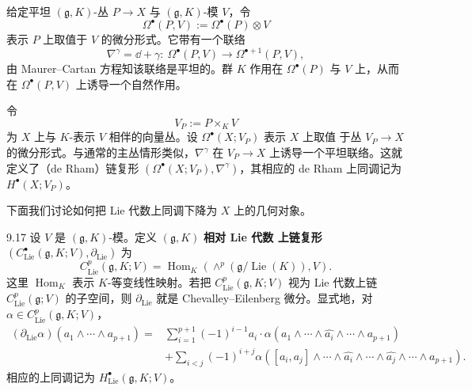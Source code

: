 
给定平坦 $(\mathfrak{g},K)$-丛 $P\to X$ 与 $(\mathfrak{g},K)$-模 $V$，令
\[
  \Omega^\bullet(P,V):=\Omega^\bullet(P)\otimes V
\]
表示 $P$ 上取值于 $V$ 的微分形式。它带有一个联络
\[
  \nabla^\gamma=\dd+\gamma:\ \Omega^\bullet(P,V)\longrightarrow\Omega^{\bullet+1}(P,V),
\]
由 Maurer--Cartan 方程知该联络是平坦的。群 $K$ 作用在 $\Omega^\bullet(P)$ 与 $V$
上，从而在 $\Omega^\bullet(P,V)$ 上诱导一个自然作用。

令
\[
  V_P:=P\times_K V
\]
为 $X$ 上与 $K$-表示 $V$ 相伴的向量丛。设 $\Omega^\bullet(X;V_P)$ 表示 $X$ 上取值
于丛 $V_P\to X$ 的微分形式。与通常的主丛情形类似，$\nabla^\gamma$ 在 $V_P\to X$
上诱导一个平坦联络。这就定义了（de Rham）链复形
$(\Omega^\bullet(X;V_P),\nabla^\gamma)$，其相应的 de Rham 上同调记为
$H^\bullet(X;V_P)$。

下面我们讨论如何把 Lie 代数上同调下降为 $X$ 上的几何对象。

\begin{wdefn}{9.17}
  设 $V$ 是 $(\mathfrak{g},K)$-模。定义 $(\mathfrak{g},K)$ \textbf{相对 Lie 代数
  上链复形} $(C^\bullet_{\mathrm{Lie}}(\mathfrak{g},K;V),\partial_{\mathrm{Lie}})$ 为
  \[
    C^p_{\mathrm{Lie}}(\mathfrak{g},K;V)
    =\operatorname{Hom}_K\left(\wedge^p(\mathfrak{g}/\operatorname{Lie}(K)),V\right).
  \]
  这里 $\operatorname{Hom}_K$ 表示 $K$-等变线性映射。若把
  $C^p_{\mathrm{Lie}}(\mathfrak{g},K;V)$ 视为 Lie 代数上链
  $C^p_{\mathrm{Lie}}(\mathfrak{g};V)$ 的子空间，则 $\partial_{\mathrm{Lie}}$ 就是
  Chevalley--Eilenberg 微分。显式地，对
  $\alpha\in C^p_{\mathrm{Lie}}(\mathfrak{g},K;V)$，
  \[
    \begin{aligned}
      (\partial_{\mathrm{Lie}}\alpha)(a_1\wedge\cdots\wedge a_{p+1})
      ={}&\sum_{i=1}^{p+1}(-1)^{i-1}a_i\cdot
      \alpha\left(a_1\wedge\cdots\wedge\widehat{a_i}\wedge\cdots\wedge a_{p+1}\right)\\
      &+\sum_{i<j}(-1)^{i+j}\alpha\left([a_i,a_j]\wedge\cdots\wedge\widehat{a_i}
      \wedge\cdots\wedge\widehat{a_j}\wedge\cdots\wedge a_{p+1}\right).
    \end{aligned}
  \]
  相应的上同调记为 $H^\bullet_{\mathrm{Lie}}(\mathfrak{g},K;V)$。
\end{wdefn}

